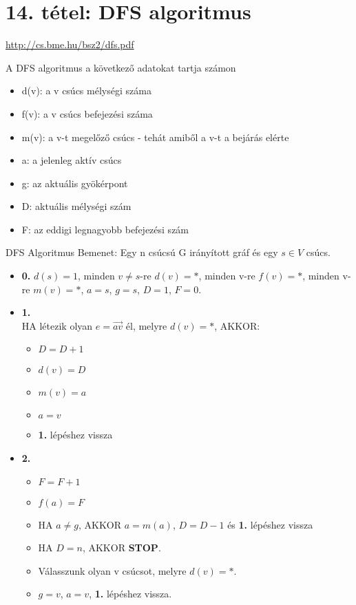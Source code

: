 \section{14. tétel: DFS algoritmus}

\url{http://cs.bme.hu/bsz2/dfs.pdf}

\begin{tetel}{A DFS algoritmus a következő adatokat tartja számon}
\begin{itemize}
\item d(v): a v csúcs mélységi száma
\item f(v): a v csúcs befejezési száma
\item m(v): a v-t megelőző csúcs - tehát amiből a v-t a bejárás elérte
\item a: a jelenleg aktív csúcs
\item g: az aktuális gyökérpont
\item D: aktuális mélységi szám
\item F: az eddigi legnagyobb befejezési szám
\end{itemize}
\end{tetel}

\begin{tetel}{DFS Algoritmus}
Bemenet: Egy n csúcsú G irányított gráf és egy $s \in V$ csúcs.
\begin{itemize}
\item{\textbf{0.}} $d(s) = 1$, minden $v \neq s$-re $d(v) = *$, minden v-re $f(v) = *$, minden v-re $m(v) = *$, $a = s$, $g = s$, $D = 1$, $F = 0$.
\item{\textbf{1.}}
\\
HA létezik olyan $e = \overrightarrow{av}$ él, melyre $d(v) = *$, AKKOR:
	\begin{itemize}
	\item $D = D + 1$
	\item $d(v) = D$
	\item $m(v) = a$
	\item $a = v$
	\item \textbf{1.} lépéshez vissza
	\end{itemize}
\item{\textbf{2.}}
	\begin{itemize}
	\item $F = F + 1$
	\item $f(a) = F$
	\item HA $a \neq g$, AKKOR $a = m(a)$, $D = D - 1$ és \textbf{1.} lépéshez vissza
	\item HA $D = n$, AKKOR \textbf{STOP}.
	\item Válasszunk olyan v csúcsot, melyre $d(v) = *$.
	\item $g = v$, $a = v$, \textbf{1.} lépéshez vissza.
	\end{itemize}
\end{itemize}
\end{tetel}


